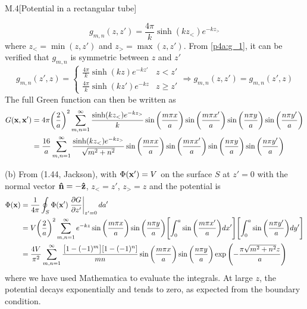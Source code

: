\documentclass[12pt]{article}
\begin{document}
\begin{problem}{M.4}[Potential in a rectangular tube]
\begin{solution}
\begin{equation}
    g_{m,n}(z,z')=\frac{4\pi}{k}\sinh(kz_<)e^{-kz_>} 
\end{equation}
where $z_< =\min(z,z')$ and $z_> =\max(z,z')$. From \eqref{p4a:g_1}, it can be
verified that $g_{m,n}$ is symmetric between $z$ and $z'$
\begin{equation}
    g_{m,n}(z',z)=\begin{cases}
        \frac{4\pi}{k}\sinh(kz)e^{-kz'} & z<z'\\
        \frac{4\pi}{k}\sinh(kz')e^{-kz} & z\geq z'
    \end{cases}
    \Rightarrow g_{m,n}(z,z')=g_{m,n}(z',z)
\end{equation}
The full Green function can then be written as
\begin{align}
    G(\vb{x},\vb{x}')
    &=4\pi\qty(\frac2a)^2\sum_{m,n=1}^\infty
    \frac{\sinh(kz_<)e^{-kz_>}}{k}
    \sin\qty(\frac{m\pi x}{a})\sin\qty(\frac{m\pi x'}{a})
    \sin\qty(\frac{n\pi y}{a})\sin\qty(\frac{n\pi y'}{a})\notag\\
    &=\frac{16}{a}\sum_{m,n=1}^\infty\frac{\sinh(kz_<)e^{-kz_>}}{\sqrt{m^2+n^2}}
    \sin\qty(\frac{m\pi x}{a})\sin\qty(\frac{m\pi x'}{a})
    \sin\qty(\frac{n\pi y}{a})\sin\qty(\frac{n\pi y'}{a})
\end{align}

(b) From (1.44, Jackson), with $\Phi(\vb{x}')=V$ on the surface $S$ at $z'=0$
with the normal vector $\vb{\hat{n}}=-\vb{\hat{z}}$, $z_< =z'$, $z_> =z$ and the potential is
\begin{align}
    \Phi(\vb{x})
    &=\frac1{4\pi}\oint_S\Phi(\vb{x}')
    \eval{\frac{\partial G}{\partial z'}}_{z'=0}da'\notag\\
    &=V\qty(\frac2a)^2\sum_{m,n=1}^\infty e^{-kz}
    \sin\qty(\frac{m\pi x}{a})\sin\qty(\frac{n\pi y}{a})
    \qty[\int_0^a\sin\qty(\frac{m\pi x'}{a})dx']
    \qty[\int_0^a\sin\qty(\frac{n\pi y'}{a})dy']
    \notag\\
    &=\frac{4V}{\pi^2}\sum_{m,n=1}^\infty
    \frac{\qty[1-(-1)^m][1-(-1)^n]}{mn}\sin\qty(\frac{m\pi x}{a})
    \sin\qty(\frac{n\pi y}{a})\exp\qty(-\frac{\pi\sqrt{m^2+n^2}z}{a})
\end{align}
where we have used Mathematica to evaluate the integrals. At large $z$, the
potential decays exponentially and tends to zero, as expected from the boundary
condition.
\end{solution}
\end{problem}
\end{document}
